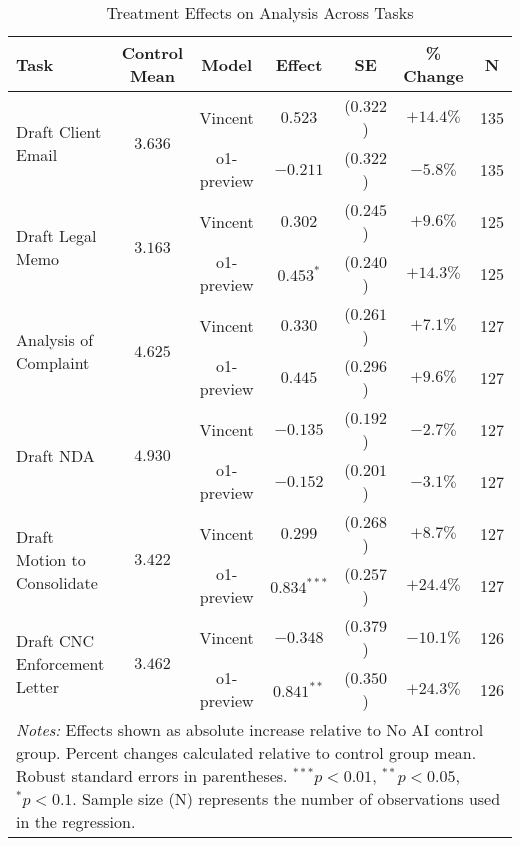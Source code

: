 \begin{table}[!htbp]
\centering
\caption{Treatment Effects on Analysis Across Tasks}
\label{tab:analysis_effects}
\begin{tabular}{lcccccc}
\hline\hline
Task & Control Mean & Model & Effect & SE & \% Change & N \\
\hline
\multirow{2}{*}{Draft Client Email} & \multirow{2}{*}{$3.636$} & Vincent & $0.523$ & ($0.322$) & $+14.4\%$ & 135 \\
& & o1-preview & $-0.211$ & ($0.322$) & $-5.8\%$ & 135 \\
\hline
\multirow{2}{*}{Draft Legal Memo} & \multirow{2}{*}{$3.163$} & Vincent & $0.302$ & ($0.245$) & $+9.6\%$ & 125 \\
& & o1-preview & $0.453^{*}$ & ($0.240$) & $+14.3\%$ & 125 \\
\hline
\multirow{2}{*}{Analysis of Complaint} & \multirow{2}{*}{$4.625$} & Vincent & $0.330$ & ($0.261$) & $+7.1\%$ & 127 \\
& & o1-preview & $0.445$ & ($0.296$) & $+9.6\%$ & 127 \\
\hline
\multirow{2}{*}{Draft NDA} & \multirow{2}{*}{$4.930$} & Vincent & $-0.135$ & ($0.192$) & $-2.7\%$ & 127 \\
& & o1-preview & $-0.152$ & ($0.201$) & $-3.1\%$ & 127 \\
\hline
\multirow{2}{*}{Draft Motion to Consolidate} & \multirow{2}{*}{$3.422$} & Vincent & $0.299$ & ($0.268$) & $+8.7\%$ & 127 \\
& & o1-preview & $0.834^{***}$ & ($0.257$) & $+24.4\%$ & 127 \\
\hline
\multirow{2}{*}{Draft CNC Enforcement Letter} & \multirow{2}{*}{$3.462$} & Vincent & $-0.348$ & ($0.379$) & $-10.1\%$ & 126 \\
& & o1-preview & $0.841^{**}$ & ($0.350$) & $+24.3\%$ & 126 \\
\hline
\multicolumn{7}{p{0.95\linewidth}}{\footnotesize \textit{Notes:} Effects shown as absolute increase relative to No AI control group. Percent changes calculated relative to control group mean. Robust standard errors in parentheses. $^{***}p<0.01$, $^{**}p<0.05$, $^{*}p<0.1$. Sample size (N) represents the number of observations used in the regression.}
\end{tabular}
\end{table}